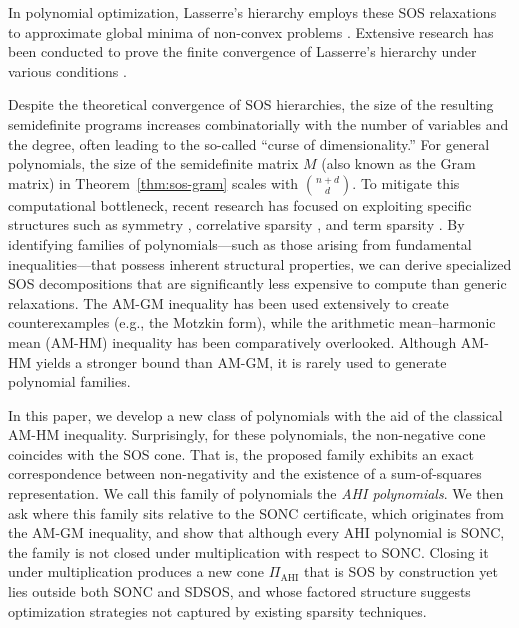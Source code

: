 \documentclass[12pt]{elsarticle}
\theoremstyle{definition}
\newcommand{\AHI}{\mathrm{AHI}}
\newcommand{\PiAHI}{\Pi_{\AHI}}
\begin{document}
In polynomial optimization, Lasserre's hierarchy \cite{lasserre2001global} employs these SOS relaxations to approximate global minima of non-convex problems \cite{lasserre2009moments,lasserre2015introduction}. Extensive research has been conducted to prove the finite convergence of Lasserre's hierarchy under various conditions \cite{laurent2007semidefinite,nie2014optimality}.

Despite the theoretical convergence of SOS hierarchies, the size of the resulting semidefinite programs increases combinatorially with the number of variables and the degree, often leading to the so-called ``curse of dimensionality.'' For general polynomials, the size of the semidefinite matrix $M$ (also known as the Gram matrix) in Theorem~\ref{thm:sos-gram} scales with $\binom{n+d}{d}$. To mitigate this computational bottleneck, recent research has focused on exploiting specific structures such as symmetry \cite{gatermann2004symmetry}, correlative sparsity \cite{waki2006sums}, and term sparsity \cite{wang2021tssos}. By identifying families of polynomials---such as those arising from fundamental inequalities---that possess inherent structural properties, we can derive specialized SOS decompositions that are significantly less expensive to compute than generic relaxations. The AM-GM inequality has been used extensively to create counterexamples (e.g., the Motzkin form), while the arithmetic mean--harmonic mean (AM-HM) inequality has been comparatively overlooked. Although AM-HM yields a stronger bound than AM-GM, it is rarely used to generate polynomial families.

In this paper, we develop a new class of polynomials with the aid of the classical AM-HM inequality. Surprisingly, for these polynomials, the non-negative cone coincides with the SOS cone. That is, the proposed family exhibits an exact correspondence between non-negativity and the existence of a sum-of-squares representation. We call this family of polynomials the \emph{AHI polynomials}. We then ask where this family sits relative to the SONC certificate, which originates from the AM-GM inequality, and show that although every AHI polynomial is SONC, the family is not closed under multiplication with respect to SONC. Closing it under multiplication produces a new cone $\PiAHI$ that is SOS by construction yet lies outside both SONC and SDSOS, and whose factored structure suggests optimization strategies not captured by existing sparsity techniques.
\end{document}
